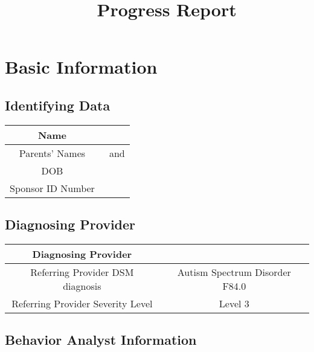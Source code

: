 \documentclass{article}
\title{\clientfirstname\ \clientlastname\ Progress Report}
\date{}
\def\clientfirstname{}
\def\clientlastname{}
\def\momname{}
\def\dadname{}
\def\DOB{}
\def\SSN{}
\def\diagnosingProvider{}
\def\diagnosis{Autism Spectrum Disorder F84.0}
\def\severity{Level 3}
\begin{document}
\tableofcontents
\newpage
\maketitle
\thispagestyle{fancy}

\section{Basic Information}

	\subsection{Identifying Data}

	\vspace{.5cm} %

		\begin{tabular}{|c||c|} %
		\hline\hline
		Name & \clientfirstname\ \clientlastname\\
		\hline\hline
		Parents' Names &  \momname\ and \dadname \\
		\hline\hline
		DOB & \DOB \\
		\hline\hline
		Sponsor ID Number & \SSN\\
		\hline\hline
		\end{tabular}

	\subsection{Diagnosing Provider}

	\vspace{.5cm}

		\begin{tabular}{|c||c|}
		\hline\hline
		Diagnosing Provider & \diagnosingProvider\\
		\hline\hline
		Referring Provider DSM diagnosis &  \diagnosis\\
		\hline\hline
		Referring Provider Severity Level & \severity\\
		\hline\hline
		\end{tabular}

	\subsection{Behavior Analyst Information}
\end{document}

